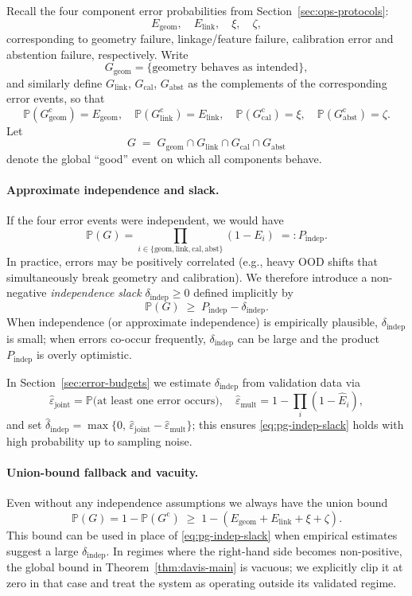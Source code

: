 \documentclass[11pt]{article}
\begin{document}
Recall the four component error probabilities from Section~\ref{sec:ops-protocols}:
\[
E_{\mathrm{geom}},\quad
E_{\mathrm{link}},\quad
\xi,\quad
\zeta,
\]
corresponding to geometry failure, linkage/feature failure, calibration error and abstention failure,
respectively.  Write
\[
G_{\mathrm{geom}} = \{ \text{geometry behaves as intended} \},
\]
and similarly define $G_{\mathrm{link}}$, $G_{\mathrm{cal}}$, $G_{\mathrm{abst}}$ as the complements of the
corresponding error events, so that
\[
\mathbb{P}(G_{\mathrm{geom}}^{\mathrm{c}}) = E_{\mathrm{geom}},\quad
\mathbb{P}(G_{\mathrm{link}}^{\mathrm{c}}) = E_{\mathrm{link}},\quad
\mathbb{P}(G_{\mathrm{cal}}^{\mathrm{c}}) = \xi,\quad
\mathbb{P}(G_{\mathrm{abst}}^{\mathrm{c}}) = \zeta.
\]
Let
\[
G \;=\; G_{\mathrm{geom}}\cap G_{\mathrm{link}}\cap G_{\mathrm{cal}}\cap G_{\mathrm{abst}}
\]
denote the global ``good'' event on which all components behave.

\paragraph{Approximate independence and slack.}
If the four error events were independent, we would have
\[
\mathbb{P}(G)
=
\prod_{i\in\{\mathrm{geom},\mathrm{link},\mathrm{cal},\mathrm{abst}\}}\!(1-E_i)
\;=:
P_{\mathrm{indep}}.
\]
In practice, errors may be positively correlated (e.g., heavy OOD shifts that simultaneously break
geometry and calibration).  We therefore introduce a non-negative \emph{independence slack}
$\delta_{\mathrm{indep}}\ge 0$ defined implicitly by
\begin{equation}
\mathbb{P}(G)
\;\ge\;
P_{\mathrm{indep}} - \delta_{\mathrm{indep}}.
\label{eq:pg-indep-slack}
\end{equation}
When independence (or approximate independence) is empirically plausible, $\delta_{\mathrm{indep}}$
is small; when errors co-occur frequently, $\delta_{\mathrm{indep}}$ can be large and the product
$P_{\mathrm{indep}}$ is overly optimistic.

In Section~\ref{sec:error-budgets} we estimate $\delta_{\mathrm{indep}}$ from validation data via
\[
\hat\varepsilon_{\mathrm{joint}}
=
\mathbb{P}\bigl(\text{at least one error occurs}\bigr),\quad
\hat\varepsilon_{\mathrm{mult}}
=
1-\prod_{i}(1-\hat E_i),
\]
and set $\hat\delta_{\mathrm{indep}} = \max\{0,\,\hat\varepsilon_{\mathrm{joint}}-\hat\varepsilon_{\mathrm{mult}}\}$;
this ensures \eqref{eq:pg-indep-slack} holds with high probability up to sampling noise.

\paragraph{Union-bound fallback and vacuity.}
Even without any independence assumptions we always have the union bound
\[
\mathbb{P}(G)
=
1-\mathbb{P}(G^{\mathrm{c}})
\;\ge\;
1-(E_{\mathrm{geom}} + E_{\mathrm{link}} + \xi + \zeta).
\]
This bound can be used in place of \eqref{eq:pg-indep-slack} when empirical estimates suggest a
large $\delta_{\mathrm{indep}}$.  In regimes where the right-hand side becomes non-positive, the global
bound in Theorem~\ref{thm:davis-main} is vacuous; we explicitly clip it at zero in that case and
treat the system as operating outside its validated regime.
\end{document}
